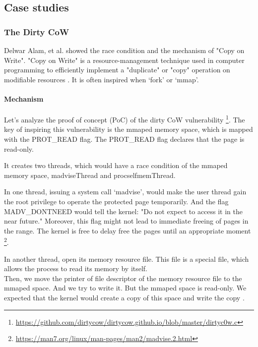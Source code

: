 \subsection{Case studies}
\label{k_case}

\subsubsection{The Dirty CoW}
Delwar Alam, et al. \cite{8019988} showed the race condition and the mechanism of "Copy on
Write". "Copy on Write" is a resource-management technique used in computer programming
to efficiently implement a "duplicate" or "copy" operation on modifiable resources \cite{6394426}.
It is often inspired when `fork' or `mmap'.

\paragraph{Mechanism}
Let's analyze the proof of concept (PoC) of the dirty CoW \cite{8019988} vulnerability
\footnote{\url{https://github.com/dirtycow/dirtycow.github.io/blob/master/dirtyc0w.c}}.
The key of inspiring this vulnerability is the mmaped memory space, which is mapped with
the PROT\_READ flag. The PROT\_READ flag declares that the page is read-only.


It creates two threads, which would have a race condition of the mmaped memory space,
madviseThread and procselfmemThread.



In one thread, issuing a system call `madvise', would make the user thread gain the root
privilege to operate the protected page temporarily. And the flag MADV\_DONTNEED would
tell the kernel: "Do not expect to access it in the near future." Moreover,
this flag might not lead to immediate freeing of pages in the range. The kernel is free
to delay free the pages until an appropriate moment \footnote{\url{https://man7.org/linux/man-pages/man2/madvise.2.html}}.



In another thread, open its memory resource file. This file is a special file, which allows
the process to read its memory by itself.\\

Then, we move the printer of file descriptor of the memory resource file to the mmaped
space. And we try to write it. But the mmaped space is read-only. We expected that the
kernel would create a copy of this space and write the copy \cite{8001953}.\\


